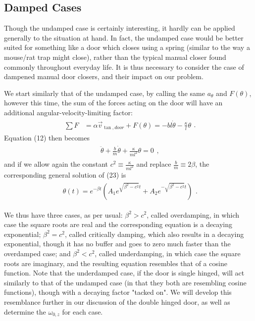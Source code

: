     \subsection{Damped Cases}
    Though the undamped case is certainly interesting, it hardly can be applied generally to the situation at hand. In fact, the undamped case would be better suited for something like a door which closes using a spring (similar to the way a mouse/rat trap might close), rather than the typical manual closer found commonly throughout everyday life. It is thus necessary to consider the case of dampened manual door closers, and their impact on our problem.\par
    We start similarly that of the undamped case, by calling the same $a_{\theta}$ and $F(\theta)$, however this time, the sum of the forces acting on the door will have an additional angular-velocity-limiting factor:
    \begin{eqnarray}
    \begin{split}
        \sum F & = \alpha\vec v_{\tan,door} + F(\theta) = -bl\dot\theta-\frac{\kappa}{l}\theta
    \end{split}.
    \end{eqnarray}
    Equation (12) then becomes
    \begin{eqnarray}
    \begin{split}
        \ddot\theta+\frac{b}{m}\dot\theta+\frac{\kappa}{ml^{2}}\theta=0
    \end{split},
    \end{eqnarray}
    and if we allow again the constant $c^{2}\equiv\frac{\kappa}{ml^{2}}$ and replace $\frac{b}{m}\equiv2\beta$, the corresponding general solution of (23) is
    \begin{eqnarray}
    \begin{split}
        \theta(t)=e^{-\beta t}(A_{1}e^{\sqrt{\beta^{2}-c^{2}}t}+A_{2}e^{-\sqrt{\beta^{2}-c^{2}}t})
    \end{split}.
    \end{eqnarray} \par
    We thus have three cases, as per usual:
    $\beta^{2}>c^{2}$, called overdamping, in which case the square roots are real and the corresponding equation is a decaying exponential; $\beta^{2}=c^{2}$, called critically damping, which also results in a decaying exponential, though it has no buffer and goes to zero much faster than the overdamped case; and $\beta^{2}<c^{2}$, called underdamping, in which case the square roots are imaginary, and the resulting equation resembles that of a cosine function. Note that the underdamped case, if the door is single hinged, will act similarly to that of the undamped case (in that they both are resembling cosine functions), though with a decaying factor "tacked on". We will develop this resemblance further in our discussion of the double hinged door, as well as determine the $\omega_{0,z}$ for each case.\\
